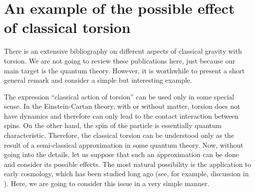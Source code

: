 \section{An example of the possible effect of 
classical torsion}

There is an extensive bibliography on different aspects 
of classical gravity with torsion. We are not going to review 
these publications here, just because our main target is the
quantum theory. However, it is worthwhile to present 
a short general remark and consider a simple but interesting 
example.

The expression ``classical action of torsion'' can be used only 
in some special sense. In the Einstein-Cartan theory, with or 
without matter, torsion does not have dynamics and therefore 
can only lead to the contact interaction between spins. On the 
other hand, the spin of the particle is essentially quantum 
characteristic. Therefore, the classical torsion can be 
understood only as the result of a semi-classical approximation 
in some quantum theory. Now, without going into the details, 
let us suppose that such an approximation can be
done and consider its possible effects. The most natural
possibility is the application to early cosmology, which has
been studied long ago (see, for example, discussion in 
\cite{hehl}). Here, we are going to consider this issue in 
a very simple manner. 

